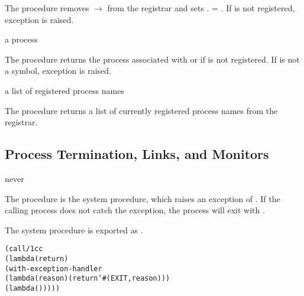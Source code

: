 The  procedure removes  $\rightarrow$
 from the registrar and sets .
= .  If  is not registered, exception
 is raised.

\begin{procedure}
\end{procedure}
\returns{} a process \alt{} 

The  procedure returns the process associated with
 or  if  is not registered.  If
 is not a symbol, exception  is raised.

\begin{procedure}
\end{procedure}
\returns{} a list of registered process names

The  procedure returns a list of currently
registered process names from the registrar.

\subsection {Process Termination, Links, and Monitors}

\begin{procedure}
\end{procedure}
\returns{} never

The  procedure is the system  procedure,
which raises an exception of . If the calling process does
not catch the exception, the process will exit with .

The system  procedure is exported as
.

\begin{syntax}
\end{syntax}
\expandsto{}\begin{alltt}\antipar
(call/1cc
 (lambda (return)
   (with-exception-handler
    (lambda (reason) (return `#(EXIT ,reason)))
    (lambda ()   \etc{}))))\end{alltt}

